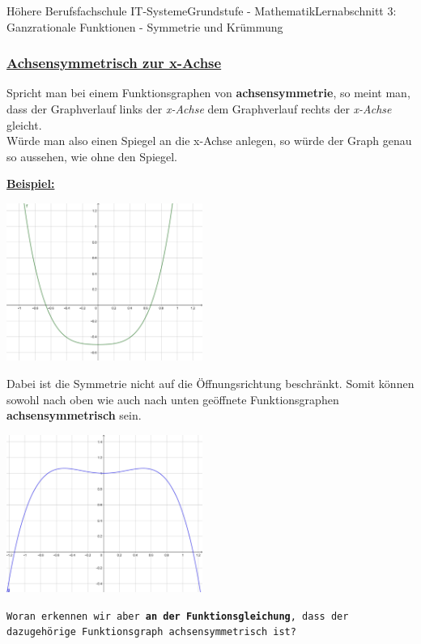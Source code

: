 \documentclass[11pt,twocolumn,oneside,openany,headings=optiontotoc,11pt,numbers=noenddot]{article}
\begin{document}
\begin{worksheet}{Höhere Berufsfachschule IT-Systeme}{Grundstufe - Mathematik}{Lernabschnitt 3: Ganzrationale Funktionen - Symmetrie und Krümmung}
		\subsubsection{\underline{Achsensymmetrisch zur x-Achse}}
		Spricht man bei einem Funktionsgraphen von \textbf{achsensymmetrie}, so meint man, dass der Graphverlauf links der \textit{x-Achse} dem Graphverlauf rechts der \textit{x-Achse} gleicht.\\
		Würde man also einen Spiegel an die x-Achse anlegen, so würde der Graph genau so aussehen, wie ohne den Spiegel.\\
		\par\noindent
		\underline{\textbf{Beispiel:}}\\
		\par\noindent
		\includegraphics[width=0.48\textwidth]{../99_Bilder/asymm.jpg}\\
		\par\noindent
		Dabei ist die Symmetrie nicht auf die Öffnungsrichtung beschränkt. Somit können sowohl nach oben wie auch nach unten geöffnete Funktionsgraphen \textbf{achsensymmetrisch} sein.\\
		\par\noindent
		\includegraphics[width=0.48\textwidth]{../99_Bilder/asymm_2.jpg}\\
		\par\noindent
		\texttt{Woran erkennen wir aber \textbf{an der Funktionsgleichung}, dass der dazugehörige Funktionsgraph achsensymmetrisch ist?}
		\begin{framed}

\end{framed}
\end{worksheet}
\end{document}
